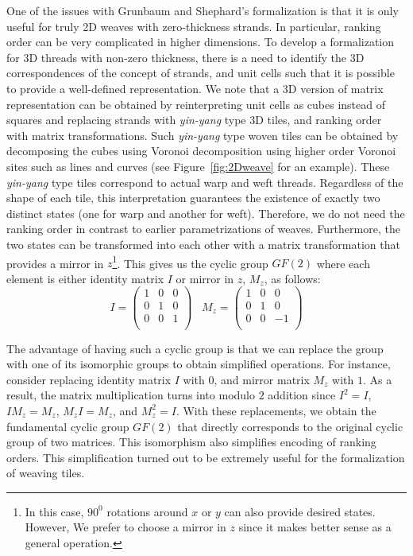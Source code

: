 \documentclass[times,twocolumn,final]{elsarticle}
\begin{document}
One of the issues with Grunbaum and Shephard's formalization is that it is only useful for truly 2D weaves with zero-thickness strands. In particular, ranking order can be very complicated in higher dimensions. To develop a formalization for 3D threads with non-zero thickness, there is a need to identify the 3D correspondences of the concept of strands, and unit cells such that it is possible to provide a well-defined representation. 
We note that a 3D version of matrix representation can be obtained by reinterpreting unit cells as cubes instead of squares and replacing strands with \textit{yin-yang} type 3D tiles, and ranking order with matrix transformations. Such \textit{yin-yang} type woven tiles can be obtained by decomposing the cubes using Voronoi decomposition using higher order Voronoi sites such as lines and curves \cite{krishnamurthy2021geometrically,krishnamurthy2020bi} (see Figure~\ref{fig:2Dweave} for an example). These \textit{yin-yang} type tiles correspond to actual warp and weft threads. Regardless of the shape of each tile, this interpretation guarantees the existence of exactly two distinct states (one for warp and another for weft). Therefore, we do not need the ranking order in contrast to earlier parametrizations of weaves. Furthermore, the two states can be transformed into each other with a matrix transformation that provides a mirror in $z$\footnote{In this case, $90^0$ rotations around $x$ or $y$ can also provide desired states. However, We prefer to choose a mirror in $z$ since it makes better sense as a general operation.}. This gives us the cyclic group $GF(2)$ where each element is either identity matrix $I$ or mirror in $z$, $M_z$, as follows: 
\begin{equation} 
I =
\begin{pmatrix}
1 & 0 & 0\\
0 & 1 & 0\\
0 & 0 & 1\\
\end{pmatrix}
\; \; \; 
M_z =
\begin{pmatrix}
1 & 0 & 0\\
0 & 1 & 0\\
0 & 0 & -1\\
\end{pmatrix}
\label{Eq:2DMatrices}
\end{equation}

The advantage of having such a cyclic group is that we can replace the group with one of its isomorphic groups to obtain simplified operations. For instance, consider replacing identity matrix $I$ with $0$, and mirror matrix $M_z$ with $1$. As a result, the matrix multiplication turns into modulo $2$ addition since $I^2 = I$, $I M_z = M_z$, $M_z I = M_z$, and $M^2_z = I$. With these replacements, we obtain the fundamental cyclic group $GF(2)$ that directly corresponds to the original cyclic group of two matrices. This isomorphism also simplifies encoding of ranking orders. This simplification turned out to be extremely useful for the formalization of weaving tiles. 
\end{document}
